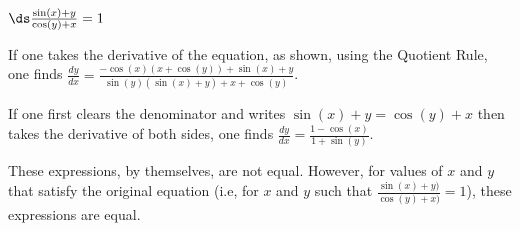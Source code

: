 {$\ds\frac{\sin (x)+y}{\cos (y)+x}=1$
}
{If one takes the derivative of the equation, as shown, using the Quotient Rule, one finds $\frac{dy}{dx} = \frac{-\cos (x) (x+\cos (y))+\sin (x)+y}{\sin (y) (\sin (x)+y)+x+\cos (y)}$.

If one first clears the denominator and writes $\sin(x)+y = \cos(y)+x$ then takes the derivative of both sides, one finds $\frac{dy}{dx} = \frac{1-\cos(x)}{1+\sin(y)}$.

These expressions, by themselves, are not equal. However, for values of $x$ and $y$ that satisfy the original equation (i.e, for $x$ and $y$ such that $\frac{\sin(x)+y)}{\cos(y)+x)}=1$), these expressions are equal.
}
